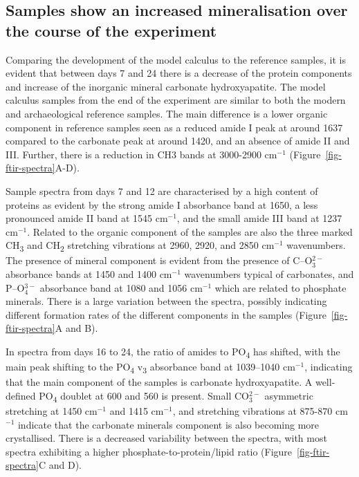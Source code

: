 \documentclass[
]{article}
\begin{document}
\hypertarget{samples-show-an-increased-mineralisation-over-the-course-of-the-experiment}{%
\subsection{Samples show an increased mineralisation over the course of
the
experiment}\label{samples-show-an-increased-mineralisation-over-the-course-of-the-experiment}}

Comparing the development of the model calculus to the reference
samples, it is evident that between days 7 and 24 there is a decrease of
the protein components and increase of the inorganic mineral carbonate
hydroxyapatite. The model calculus samples from the end of the
experiment are similar to both the modern and archaeological reference
samples. The main difference is a lower organic component in reference
samples seen as a reduced amide I peak at around 1637 compared to the
carbonate peak at around 1420, and an absence of amide II and III.
Further, there is a reduction in CH3 bands at 3000-2900 cm\(^{-1}\)
(Figure~\ref{fig-ftir-spectra}A-D).

Sample spectra from days 7 and 12 are characterised by a high content of
proteins as evident by the strong amide I absorbance band at 1650, a
less pronounced amide II band at 1545 cm\(^{-1}\), and the small amide
III band at 1237 cm\(^{-1}\). Related to the organic component of the
samples are also the three marked CH\textsubscript{3} and
CH\textsubscript{2} stretching vibrations at 2960, 2920, and 2850
cm\(^{-1}\) wavenumbers. The presence of mineral component is evident
from the presence of C--O\(^{2-}_3\) absorbance bands at 1450 and 1400
cm\(^{-1}\) wavenumbers typical of carbonates, and P--O\(^{3-}_4\)
absorbance band at 1080 and 1056 cm\(^{-1}\) which are related to
phosphate minerals. There is a large variation between the spectra,
possibly indicating different formation rates of the different
components in the samples (Figure~\ref{fig-ftir-spectra}A and B).

In spectra from days 16 to 24, the ratio of amides to
PO\textsubscript{4} has shifted, with the main peak shifting to the
PO\textsubscript{4} v\textsubscript{3} absorbance band at 1039--1040
cm\(^{-1}\), indicating that the main component of the samples is
carbonate hydroxyapatite. A well-defined PO\textsubscript{4} doublet at
600 and 560 is present. Small CO\(_3^{2-}\) asymmetric stretching at
1450 cm\(^{-1}\) and 1415 cm\(^{-1}\), and stretching vibrations at
875-870 cm\(^{-1}\) indicate that the carbonate minerals component is
also becoming more crystallised. There is a decreased variability
between the spectra, with most spectra exhibiting a higher
phosphate-to-protein/lipid ratio (Figure~\ref{fig-ftir-spectra}C and D).
\end{document}
